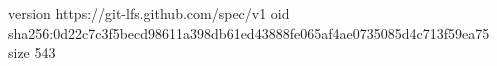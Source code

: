 version https://git-lfs.github.com/spec/v1
oid sha256:0d22c7c3f5becd98611a398db61ed43888fe065af4ae0735085d4c713f59ea75
size 543
